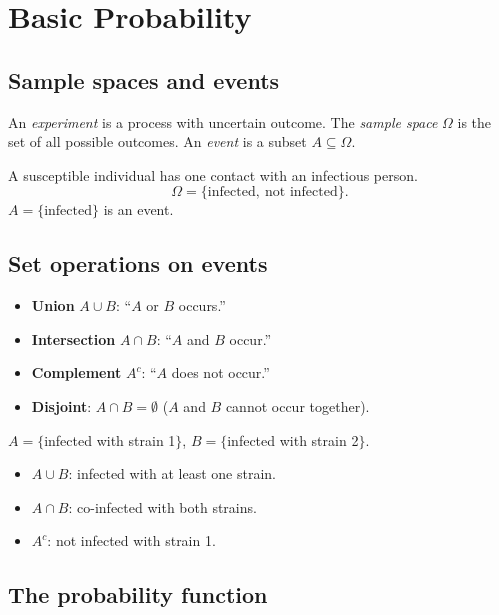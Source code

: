 \chapter{Basic Probability}

\section{Sample spaces and events}

\begin{definition}
An \emph{experiment} is a process with uncertain outcome. The
\emph{sample space} $\Omega$ is the set of all possible outcomes. An
\emph{event} is a subset $A\subseteq\Omega$.
\end{definition}

\begin{example}
A susceptible individual has one contact with an infectious person.
\[
\Omega=\{\text{infected},\ \text{not infected}\}.
\]
$A=\{\text{infected}\}$ is an event.
\end{example}

\section{Set operations on events}

\begin{itemize}
  \item \textbf{Union} $A\cup B$: ``$A$ or $B$ occurs.''
  \item \textbf{Intersection} $A\cap B$: ``$A$ and $B$ occur.''
  \item \textbf{Complement} $A^c$: ``$A$ does not occur.''
  \item \textbf{Disjoint}: $A\cap B=\emptyset$ ($A$ and $B$ cannot occur together).
\end{itemize}

\begin{example}
$A=\{$infected with strain 1$\}$, $B=\{$infected with strain 2$\}$.
\begin{itemize}[nosep]
  \item $A\cup B$: infected with at least one strain.
  \item $A\cap B$: co-infected with both strains.
  \item $A^c$: not infected with strain 1.
\end{itemize}
\end{example}

\section{The probability function}

